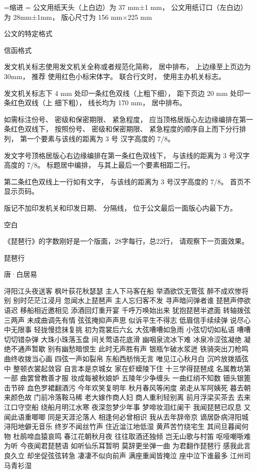 \documentclass[a4paper,twoside]{article}
\begin{document}
\fontsize{15.85pt}{0pt}
=\hbox{缩进}
\parindent=
\baselineskip=29.71875pt
公文用纸天头（上白边）为 37 mm±1 mm，
公文用纸订口（左白边）为 28mm±1mm，
版心尺寸为 156 mm×225 mm

 公文的特定格式

 信函格式

发文机关标志使用发文机关全称或者规范化简称， 居中排布， 上边缘至上页边为 30mm， 推荐
使用红色小标宋体字。 联合行文时， 使用主办机关标志。

发文机关标志下 4 mm 处印一条红色双线（上粗下细）， 距下页边 20 mm 处印一条红色双线（上
细下粗）， 线长均为 170 mm， 居中排布。

如需标注份号、 密级和保密期限、 紧急程度， 应当顶格居版心左边缘编排在第一条红色双线下，
按照份号、 密级和保密期限、 紧急程度的顺序自上而下分行排列， 第一个要素与该线的距离为 3 号
汉字高度的 7/8。

发文字号顶格居版心右边缘编排在第一条红色双线下， 与该线的距离为 3 号汉字高度的 7/8。
标题居中编排， 与其上最后一个要素相距二行。

第二条红色双线上一行如有文字， 与该线的距离为 3 号汉字高度的 7/8。
首页不显示页码。

版记不加印发机关和印发日期、 分隔线， 位于公文最后一面版心内最下方。
\newpage
\begin{center}
  空白
\end{center}

\vfill
《琵琶行》的字数刚好是一个版面，28字每行，总22行，
请观察下一页面效果。
\begin{center}
琵\quad 琶\quad 行

唐·白居易
\end{center}
\newpage
\noindent%
浔阳江头夜送客 枫叶荻花秋瑟瑟
主人下马客在船 举酒欲饮无管弦%
醉不成欢惨将别 别时茫茫江浸月
%
忽闻水上琵琶声 主人忘归客不发%
寻声暗问弹者谁 琵琶声停欲语迟
移船相近邀相见 添酒回灯重开宴%
千呼万唤始出来 犹抱琵琶半遮面
转轴拨弦三两声 未成曲调先有情%
弦弦掩抑声声思 似诉平生不得志
低眉信手续续弹 说尽心中无限事%
轻拢慢捻抹复挑 初为霓裳后六幺
大弦嘈嘈如急雨 小弦切切如私语%
嘈嘈切切错杂弹 大珠小珠落玉盘
间关莺语花底滑 幽咽泉流冰下难%
冰泉冷涩弦凝绝 凝绝不通声暂歇
别有幽愁暗恨生 此时无声胜有声%
银瓶乍破水浆迸 铁骑突出刀枪鸣
曲终收拨当心画 四弦一声如裂帛%
东船西舫悄无言 唯见江心秋月白
%
沉吟放拨插弦中 整顿衣裳起敛容%
自言本是京城女 家在虾蟆陵下住
十三学得琵琶成 名属教坊第一部%
曲罢曾教善才服 妆成每被秋娘妒
五陵年少争缠头 一曲红绡不知数%
钿头银篦击节碎 血色罗裙翻酒污
今年欢笑复明年 秋月春风等闲度%
弟走从军阿姨死 暮去朝来颜色故
门前冷落鞍马稀 老大嫁作商人妇%
商人重利轻别离 前月浮梁买茶去
去来江口守空船 绕船月明江水寒%
夜深忽梦少年事 梦啼妆泪红阑干
%
我闻琵琶已叹息 又闻此语重唧唧%
同是天涯沦落人 相逢何必曾相识
我从去年辞帝京 谪居卧病浔阳城%
浔阳地僻无音乐 终岁不闻丝竹声
住近湓江地低湿 黄芦苦竹绕宅生%
其间旦暮闻何物 杜鹃啼血猿哀鸣
春江花朝秋月夜 往往取酒还独倾%
岂无山歌与村笛 呕哑嘲哳难为听
今夜闻君琵琶语 如听仙乐耳暂明%
莫辞更坐弹一曲 为君翻作琵琶行
感我此言良久立 却坐促弦弦转急%
凄凄不似向前声 满座重闻皆掩泣
座中泣下谁最多 江州司马青衫湿%
\end{document}

